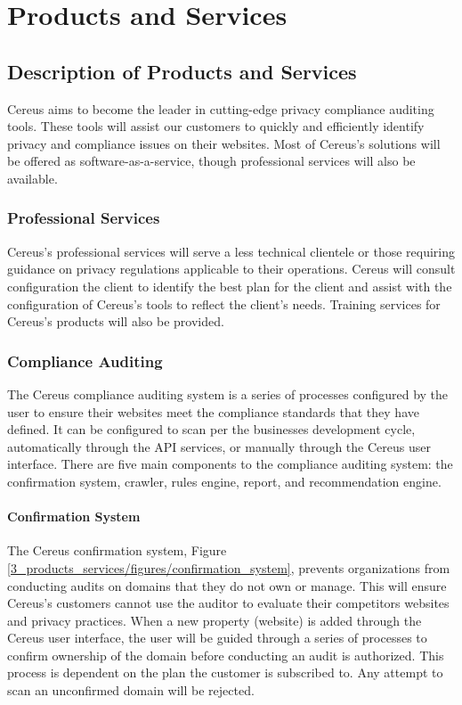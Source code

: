 {\let\cleardoublepage\relax \chapter{Products and Services}}

\section{Description of Products and Services}

Cereus aims to become the leader in cutting-edge privacy compliance auditing tools. These tools will assist our customers to quickly and efficiently identify privacy and compliance issues on their websites. Most of Cereus's solutions will be offered as software-as-a-service, though professional services will also be available.

\subsection{Professional Services}

Cereus's professional services will serve a less technical clientele or those requiring guidance on privacy regulations applicable to their operations. Cereus will consult configuration the client to identify the best plan for the client and assist with the configuration of Cereus's tools to reflect the client's needs. Training services for Cereus's products will also be provided.

\subsection{Compliance Auditing}

The Cereus compliance auditing system is a series of processes configured by the user to ensure their websites meet the compliance standards that they have defined. It can be configured to scan per the businesses development cycle, automatically through the API services, or manually through the Cereus user interface. There are five main components to the compliance auditing system: the confirmation system, crawler, rules engine, report, and recommendation engine.

\subsubsection{Confirmation System}

The Cereus confirmation system, Figure \ref{3_products_services/figures/confirmation_system}, prevents organizations from conducting audits on domains that they do not own or manage. This will ensure Cereus's customers cannot use the auditor to evaluate their competitors websites and privacy practices. When a new property (website) is added through the Cereus user interface, the user will be guided through a series of processes to confirm ownership of the domain before conducting an audit is authorized. This process is dependent on the plan the customer is subscribed to. Any attempt to scan an unconfirmed domain will be rejected.

